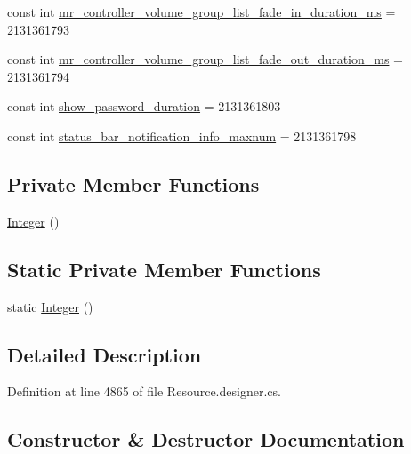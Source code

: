 \begin{DoxyCompactItemize}
const int \mbox{\hyperlink{class_f_w_p_s___app_1_1_droid_1_1_resource_1_1_integer_ac2e47d1a268c683fae2f59c768cc0b03}{mr\+\_\+controller\+\_\+volume\+\_\+group\+\_\+list\+\_\+fade\+\_\+in\+\_\+duration\+\_\+ms}} = 2131361793
\item 
const int \mbox{\hyperlink{class_f_w_p_s___app_1_1_droid_1_1_resource_1_1_integer_a87e1212b217dbd31fc7454ebeb58bccf}{mr\+\_\+controller\+\_\+volume\+\_\+group\+\_\+list\+\_\+fade\+\_\+out\+\_\+duration\+\_\+ms}} = 2131361794
\item 
const int \mbox{\hyperlink{class_f_w_p_s___app_1_1_droid_1_1_resource_1_1_integer_a862fa73de7a7b83a5d06845e4f65ed71}{show\+\_\+password\+\_\+duration}} = 2131361803
\item 
const int \mbox{\hyperlink{class_f_w_p_s___app_1_1_droid_1_1_resource_1_1_integer_aea3b7de02fd7e9f9b6de62266545f879}{status\+\_\+bar\+\_\+notification\+\_\+info\+\_\+maxnum}} = 2131361798
\end{DoxyCompactItemize}
\subsection*{Private Member Functions}
\begin{DoxyCompactItemize}
\item 
\mbox{\hyperlink{class_f_w_p_s___app_1_1_droid_1_1_resource_1_1_integer_ab8126537fb61fb0f15fd47dcb755da29}{Integer}} ()
\end{DoxyCompactItemize}
\subsection*{Static Private Member Functions}
\begin{DoxyCompactItemize}
\item 
static \mbox{\hyperlink{class_f_w_p_s___app_1_1_droid_1_1_resource_1_1_integer_ad1da8c53d13c09d9344112c9e1c74bb1}{Integer}} ()
\end{DoxyCompactItemize}


\subsection{Detailed Description}


Definition at line 4865 of file Resource.\+designer.\+cs.



\subsection{Constructor \& Destructor Documentation}
\mbox{\label{class_f_w_p_s___app_1_1_droid_1_1_resource_1_1_integer_ad1da8c53d13c09d9344112c9e1c74bb1}} 
